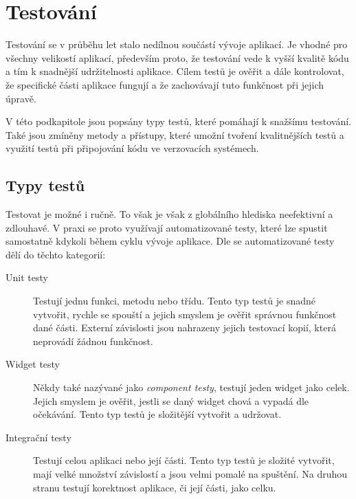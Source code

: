 \section{Testování}

Testování se v průběhu let stalo nedílnou součástí vývoje aplikací.
Je vhodné pro všechny velikostí aplikací,
především proto,
že testování vede k vyšší kvalitě kódu \cite{testing_quality}
a tím k snadnější udržitelnosti aplikace.
Cílem testů je ověřit a dále kontrolovat,
že specifické části aplikace fungují
a že zachovávají tuto funkčnost při jejich úpravě.
\cite{martin_clean_architecture}

V této podkapitole jsou popsány typy testů,
které pomáhají k snažšímu testování.
Také jsou zmíněny metody a přístupy,
které umožní tvoření kvalitnějších testů
a využití testů při připojování kódu ve verzovacích systémech.

\subsection{Typy testů}

Testovat je možné i ručně.
To však je však z globálního hlediska neefektivní a zdlouhavé.
V praxi se proto využívají automatizované testy,
které lze spustit samostatně kdykoli během cyklu vývoje aplikace.
Dle \cite{testing_flutter} se automatizované testy dělí do těchto kategorií:

\begin{description}
    \item[Unit testy] Testují jednu funkci, metodu nebo třídu.
    Tento typ testů je snadné vytvořit,
    rychle se spouští
    a jejich smyslem je ověřit správnou funkčnost dané části.
    Externí závislosti jsou nahrazeny jejich testovací kopií,
    která neprovádí žádnou funkčnost.
    \item[Widget testy] Někdy také nazývané jako \emph{component testy},
    testují jeden widget jako celek.
    Jejich smyslem je ověřit,
    jestli se daný widget chová a vypadá dle očekávání.
    Tento typ testů je složitější vytvořit a udržovat.
    \item[Integrační testy] Testují celou aplikaci nebo její části.
    Tento typ testů je složité vytvořit,
    mají velké množství závislostí a jsou velmi pomalé na spuštění.
    Na druhou stranu testují korektnost aplikace,
    či její části,
    jako celku.
\end{description}

